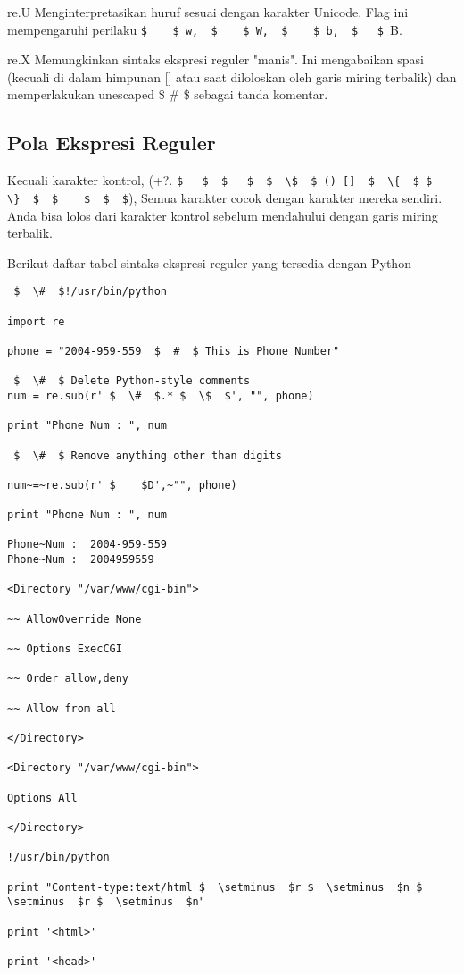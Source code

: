 \begin {enumerate}
\begin {enumerate}
re.U
Menginterpretasikan huruf sesuai dengan karakter Unicode. Flag ini mempengaruhi perilaku  \verb|$    $ w,  $    $ W,  $    $ b,  $   $ |B.

re.X
Memungkinkan sintaks ekspresi reguler "manis". Ini mengabaikan spasi (kecuali di dalam himpunan [] atau saat diloloskan oleh garis miring terbalik) dan memperlakukan unescaped  \$  \#  \$ sebagai tanda komentar.

\subsection{Pola Ekspresi Reguler}
Kecuali karakter kontrol, (+?.  \verb|$   $  $   $  $  \$  $ () []  $  \{  $ $  \}  $  $    $  $  $|), Semua karakter cocok dengan karakter mereka sendiri. Anda bisa lolos dari karakter kontrol sebelum mendahului dengan garis miring terbalik.

Berikut daftar tabel sintaks ekspresi reguler yang tersedia dengan Python -
\begin{verbatim}
 $  \#  $!/usr/bin/python

import re

phone = "2004-959-559  $  #  $ This is Phone Number"

 $  \#  $ Delete Python-style comments
num = re.sub(r' $  \#  $.* $  \$  $', "", phone)

print "Phone Num : ", num

 $  \#  $ Remove anything other than digits

num~=~re.sub(r' $    $D',~"", phone)

print "Phone Num : ", num

Phone~Num :  2004-959-559
Phone~Num :  2004959559

<Directory "/var/www/cgi-bin">

~~ AllowOverride None

~~ Options ExecCGI

~~ Order allow,deny

~~ Allow from all

</Directory>

<Directory "/var/www/cgi-bin">

Options All

</Directory>

!/usr/bin/python

print "Content-type:text/html $  \setminus  $r $  \setminus  $n $  \setminus  $r $  \setminus  $n"

print '<html>'

print '<head>'


\end{verbatim}
\end{enumerate}
\end{enumerate}
